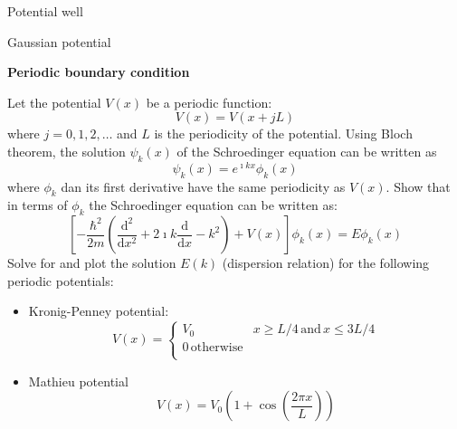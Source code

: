 Potential well

Gaussian potential


\textbf{Periodic boundary condition}

Let the potential $V(x)$ be a periodic function:
\begin{equation}
V(x) = V(x + jL)
\end{equation}
where $j = 0, 1, 2, \ldots$ and $L$ is the periodicity of the potential.
Using Bloch theorem, the solution $\psi_{k}(x)$ of the Schroedinger equation
can be written as
\begin{equation}
\psi_{k}(x) = e^{\imath k x} \phi_{k}(x)
\end{equation}
where $\phi_{k}$ dan its first derivative have the same periodicity as $V(x)$.
Show that in terms of $\phi_{k}$ the Schroedinger equation can be written as:
\begin{equation}
\left[
-\frac{\hbar^2}{2m}\left( \frac{\mathrm{d}^2}{\mathrm{d}x^2} +
2\imath k \frac{\mathrm{d}}{\mathrm{d}x} - k^2
\right) + V(x) \right] \phi_{k}(x) = E \phi_{k}(x)
\end{equation}
Solve for and plot the solution $E(k)$ (dispersion relation) for the following
periodic potentials:
\begin{itemize}
\item Kronig-Penney potential:
\begin{equation}
V(x) = \begin{cases}
V_{0} & x \geq L/4 \, \text{and} \, x \leq 3L/4 \\
0 \, \text{otherwise} \\
\end{cases}
\end{equation}
%
\item Mathieu potential
\begin{equation}
V(x) = V_{0} \left( 1 + \cos\left(\frac{2\pi x}{L}\right) \right)
\end{equation}
\end{itemize}
